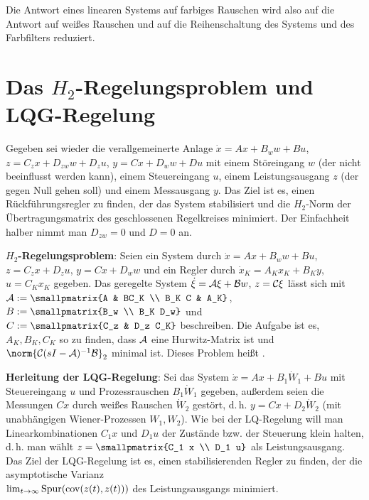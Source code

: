 Die Antwort eines linearen Systems auf farbiges Rauschen wird also auf die Antwort auf weißes
Rauschen und auf die Reihenschaltung des Systems und des Farbfilters reduziert.

\pagebreak

\section{%
    Das \texorpdfstring{$H_2$-Regelungsproblem}{H₂-Regelungsproblem} und
    LQG-Regelung%
}

Gegeben sei wieder die verallgemeinerte Anlage $\dot{x} = Ax + B_w w + Bu$,
$z = C_z x + D_{zw} w + D_z u$, $y = Cx + D_w w + Du$
mit einem Störeingang $w$ (der nicht beeinflusst werden kann),
einem Steuereingang $u$,
einem Leistungsausgang $z$ (der gegen Null gehen soll) und
einem Messausgang $y$.
Das Ziel ist es, einen Rückführungsregler zu finden, der das System stabilisiert und
die $H_2$-Norm der Übertragungsmatrix des geschlossenen Regelkreises minimiert.
Der Einfachheit halber nimmt man $D_{zw} = 0$ und $D = 0$ an.

\textbf{$H_2$-Regelungsproblem}:
Seien ein System durch $\dot{x} = Ax + B_w w + Bu$, $z = C_z x + D_z u$, $y = Cx + D_w w$
und ein Regler durch $\dot{x}_K = A_K x_K + B_K y$, $u = C_K x_K$ gegeben.
Das geregelte System $\dot{\xi} = \mathcal{A}\xi + \mathcal{B} w$, $z = \mathcal{C}\xi$ lässt sich mit
$\A := \smallpmatrix{A & BC_K \\ B_K C & A_K}$,
$B := \smallpmatrix{B_w \\ B_K D_w}$ und
$C := \smallpmatrix{C_z & D_z C_K}$ beschreiben.
Die Aufgabe ist es, $A_K, B_K, C_K$ so zu finden, dass
$\mathcal{A}$ eine Hurwitz-Matrix ist und
$\norm{\C (sI - \A)^{-1} \B}_2$ minimal ist.
Dieses Problem heißt .

\linie

\textbf{Herleitung der LQG-Regelung}:
Sei das System $\dot{x} = Ax + B_1 \dot{W}_1 + Bu$ mit Steuereingang $u$ und
Prozessrauschen $B_1 \dot{W}_1$ gegeben, außerdem seien die Messungen $Cx$ durch
weißes Rauschen $\dot{W}_2$ gestört, d.\,h.
$y = Cx + D_2 \dot{W}_2$ (mit unabhängigen Wiener-Prozessen $W_1, W_2$).
Wie bei der LQ-Regelung will man Linearkombinationen $C_1 x$ und $D_1 u$ der Zustände bzw. der
Steuerung klein halten, d.\,h. man wählt
$z = \smallpmatrix{C_1 x \\ D_1 u}$ als Leistungsausgang.
Das Ziel der LQG-Regelung ist es, einen stabilisierenden Regler zu finden, der die
asymptotische Varianz\\
$\lim_{t \to \infty} \operatorname{Spur}(\operatorname{cov}(z(t), z(t)))$ des Leistungsausgangs minimiert.

